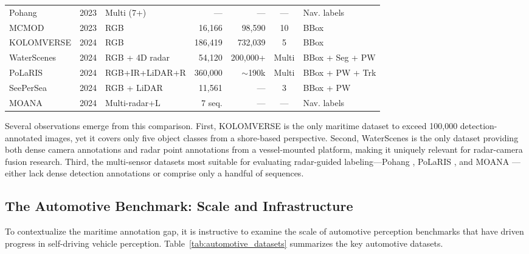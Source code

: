 \begin{table}[!htbp]
\begin{tabularx}{\textwidth}{@{}l c l r r c X@{}}
Pohang \cite{Chung2023Pohang}          & 2023 & Multi (7+)     &       ---   &      ---   & ---      & Nav. labels \\
MCMOD \cite{Sun2023MCMOD}              & 2023 & RGB            &     16,166  &   98,590   & 10       & BBox \\
KOLOMVERSE \cite{Nanda2024KOLOMVERSE}  & 2024 & RGB            &    186,419  &  732,039   & 5        & BBox \\
WaterScenes \cite{Zhang2024WaterScenes}& 2024 & RGB + 4D radar &     54,120  &  200,000+  & Multi    & BBox + Seg + PW \\
PoLaRIS \cite{Choi2024PoLaRIS}        & 2024 & RGB+IR+LiDAR+R &    360,000  & $\sim$190k & Multi    & BBox + PW + Trk \\
SeePerSea \cite{Jeong2024SeePerSea}    & 2024 & RGB + LiDAR    &     11,561  &      ---   & 3        & BBox + PW \\
MOANA \cite{Jang2024MOANA}             & 2024 & Multi-radar+L  &    7 seq.   &      ---   & ---      & Nav. labels \\
\bottomrule
\end{tabularx}
\end{table}

Several observations emerge from this comparison. First, KOLOMVERSE \cite{Nanda2024KOLOMVERSE}
is the only maritime dataset to exceed 100,000 detection-annotated images, yet it covers
only five object classes from a shore-based perspective. Second, WaterScenes
\cite{Zhang2024WaterScenes} is the only dataset providing both dense camera annotations
and radar point annotations from a vessel-mounted platform, making it uniquely relevant
for radar-camera fusion research. Third, the multi-sensor datasets most suitable for
evaluating radar-guided labeling---Pohang \cite{Chung2023Pohang}, PoLaRIS
\cite{Choi2024PoLaRIS}, and MOANA \cite{Jang2024MOANA}---either lack dense detection
annotations or comprise only a handful of sequences.

\subsection{The Automotive Benchmark: Scale and Infrastructure}
\label{subsec:automotive_comparison}

To contextualize the maritime annotation gap, it is instructive to examine the scale of
automotive perception benchmarks that have driven progress in self-driving vehicle
perception. Table~\ref{tab:automotive_datasets} summarizes the key automotive datasets.

